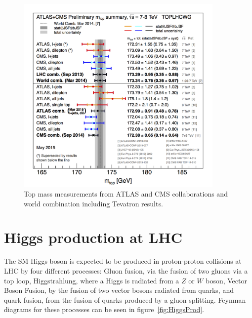 \begin{figure}[!Hhtbp]
  \begin{center}
    \includegraphics[width=0.9\textwidth]{figs/LHC_topmass_May2015.png}
    \caption{Top mass measurements from ATLAS and CMS collaborations and world combination including Tevatron results.}
    \label{fig:TopMass}
  \end{center}
\end{figure}

%
%

\section{Higgs production at LHC}

The SM Higgs boson is expected to be produced in proton-proton collisions at LHC by four different processes: Gluon fusion, via the fusion of two gluons via a top loop, Higgstrahlung, where a Higgs is radiated from a $Z$ or $W$ boson, Vector Boson Fusion, by the fusion of two vector bosons radiated from quarks, and quark fusion, from the fusion of quarks produced by a gluon splitting. Feynman diagrams for these processes can be seen in figure~\ref{fig:HiggsProd}. 

